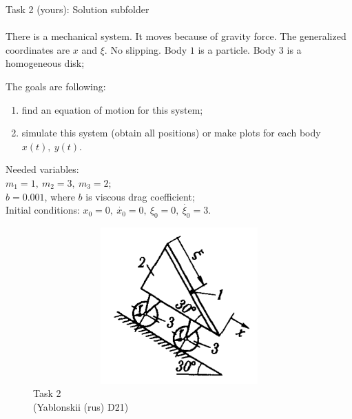 \documentclass[aspectratio=169]{beamer}
\newcommand{\fbckg}[1]{\usebackgroundtemplate{\texttt{[image: \#1]}}}%
\begin{document}
\begin{frame}[t]{Task 2 (yours): Solution subfolder}
\framesubtitle{}
\small
\begin{minipage}{0.65\textwidth}
  There is a mechanical system. It moves because of gravity force. The generalized coordinates are $x$ and $\xi$. No slipping. Body $1$ is a particle. Body $3$ is a homogeneous disk;

  The goals are following:
  \begin{enumerate}
      \item find an equation of motion for this system;
      \item simulate this system (obtain all positions) or make plots for each body $x(t),\ y(t)$.
  \end{enumerate}
  Needed variables:\\
  $m_1= 1,\ m_2=3,\ m_3=2$;\\
  $b = 0.001 $, where $b$ is viscous drag coefficient;\\
  Initial conditions: $x_0=0,\ \dot{x_0}=0,\ \xi_0=0,\ \dot{\xi_0}=3$.
\end{minipage}
\begin{minipage}{0.34\textwidth}
  \begin{figure}[H]
    \centering\includegraphics[height=6cm,width=1\textwidth,keepaspectratio]{HW7_1}
    \caption*{Task 2 \\ (Yablonskii (rus) D21)}
  \end{figure}
\end{minipage}
\end{frame}


\fbckg{fibeamer/figs/last_page.png}
\frame[plain]{}
\end{document}
